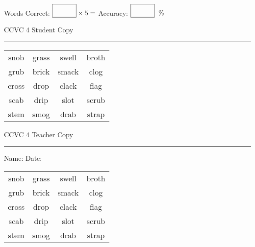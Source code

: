 \documentclass{memoir}
\begin{document}
\normalsize

Words Correct: $\fbox{\phantom{\huge 100}} \times 5 = $ Accuracy: $\fbox{\phantom{\huge 100}}\;\; \%$ 

\vfill

\newpage


\footnotesize \noindent
CCVC 4 \hfill Student Copy
\smallskip
\hrule

\Large

\setlength{\tabcolsep}{14pt}
\def\arraystretch{3}

{\selectfont


\begin{vplace}[0.5]
\begin{center}
\begin{tabular}{cccc}
snob & grass                    & swell & broth    \\
grub & brick       & smack & clog \\
cross & drop & clack             & flag             \\
scab & drip & slot & scrub \\
stem & smog & drab             & strap \\
\end{tabular}
\end{center}
\end{vplace}

}

\newpage

\footnotesize \noindent
CCVC 4 \hfill Teacher Copy
\smallskip
\hrule

\normalsize

\vfill

\noindent
Name: \underline{\hspace{1.75in}} \hfill Date: \underline{\hspace{1in}}

\Large

{\selectfont


\begin{vplace}[0.5]
\begin{center}
\begin{tabular}{cccc}
snob & grass                    & swell & broth    \\
grub & brick       & smack & clog \\
cross & drop & clack             & flag             \\
scab & drip & slot & scrub \\
stem & smog & drab             & strap \\
\end{tabular}
\end{center}
\end{vplace}



}
\end{document}
